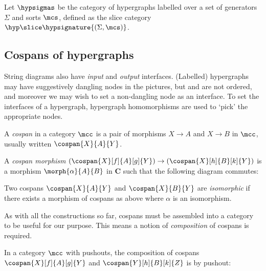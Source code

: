 \begin{definition}
    Let \(\hypsigmas\) be the category of hypergraphs labelled over a set of
    generators \(\Sigma\) and sorts \(\mcs\), defined as the slice category
    \(\hyp \slice \hypsignature{(\Sigma, \mcs)}\).
\end{definition}

\begin{example}
\end{example}

\subsection{Cospans of hypergraphs}

String diagrams also have \emph{input} and \emph{output} interfaces.
(Labelled) hypergraphs may have suggestively dangling nodes in the pictures,
but and are not ordered, and moreover we may wish to set a non-dangling node
as an interface.
To set the interfaces of a hypergraph, hypergraph homomorphisms are used
to `pick' the appropriate nodes.

\begin{definition}[Cospan]
    A \emph{cospan} in a category \(\mcc\) is a pair of morphisms \(X \to A\)
    and \(X \to B\) in \(\mcc\), usually written \(\cospan{X}{A}{Y}\).

    A \emph{cospan morphism} \(
        (\cospan{X}[f]{A}[g]{Y}) \to (\cospan{X}[h]{B}[k]{Y})
    \) is a morphism \(\morph{\alpha}{A}{B}\) in \(\mathbf{C}\)
    such that the following diagram commutes:
    \begin{center}
        
    \end{center}
%
    Two cospans \(\cospan{X}{A}{Y}\) and \(\cospan{X}{B}{Y}\) are
    \emph{isomorphic} if there exists a morphism of cospans as above where
    \(\alpha\) is an isomorphism.
\end{definition}


As with all the constructions so far, cospans must be assembled into a category
to be useful for our purpose.
This means a notion of \emph{composition} of cospans is required.

\begin{definition}
    \label{def:cospan-composition}
    In a category \(\mcc\) with pushouts, the composition of cospans
    \(\cospan{X}[f]{A}[g]{Y}\) and \(\cospan{Y}[h]{B}[k]{Z}\) is by pushout:
    \begin{center}
        
    \end{center}
\end{definition}

